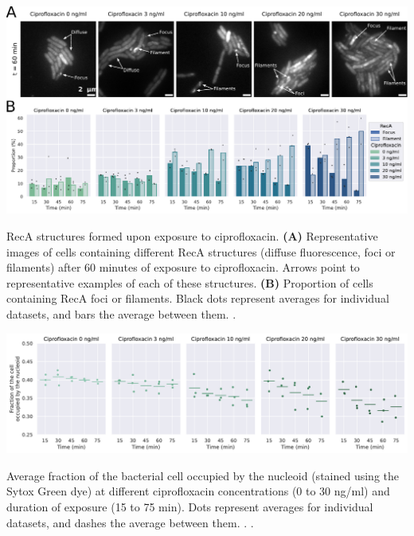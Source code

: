 \begin{suppfigure*}[htbp]
    \begin{center}
    \includegraphics[width=\textwidth]{SI_Figures/RecA_structures.pdf}
    \end{center}
    \caption{RecA structures formed upon exposure to ciprofloxacin. \textbf{(A)} Representative images of cells containing different RecA structures (diffuse fluorescence, foci or filaments) after 60 minutes of exposure to ciprofloxacin. Arrows point to representative examples of each of these structures. \textbf{(B)} Proportion of cells containing RecA foci or filaments. Black dots represent averages for individual datasets, and bars the average between them. .}
    \label{SIFig:reca_structures}
\end{suppfigure*}

\begin{suppfigure*}[htbp]
    \begin{center}
    \includegraphics[width=\textwidth]{SI_Figures/Nucleoid_compaction.pdf}
    \end{center}
    \caption{Average fraction of the bacterial cell occupied by the nucleoid (stained using the Sytox Green dye) at different ciprofloxacin concentrations (0 to 30 ng/ml) and duration of exposure (15 to 75 min). Dots represent averages for individual datasets, and dashes the average between them. . .}
    \label{SIFig:nucleoid_compaction}
\end{suppfigure*}

